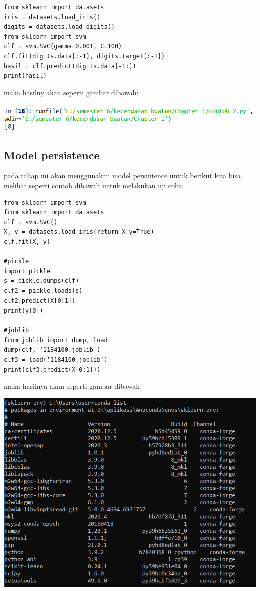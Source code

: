\documentclass{homework}
\begin{document}
\begin{verbatim}
from sklearn import datasets 
iris = datasets.load_iris()
digits = datasets.load_digits()
from sklearn import svm
clf = svm.SVC(gamma=0.001, C=100)
clf.fit(digits.data[:-1], digits.target[:-1])
hasil = clf.predict(digits.data[-1:])
print(hasil)
\end{verbatim}
maka hasilny akan seperti gambar dibawah:
\begin{center}
    \includegraphics[width=.8\textwidth]{figures/1184100/Hasil2.PNG}
\end{center}

\subsection{Model persistence}
pada tahap ini akan menggunakan model persintence untuk 
berikut kita bisa melihat seperti contoh dibawah untuk melakukan uji coba

\begin{verbatim}
from sklearn import svm
from sklearn import datasets
clf = svm.SVC()
X, y = datasets.load_iris(return_X_y=True)
clf.fit(X, y)

#pickle
import pickle 
s = pickle.dumps(clf)
clf2 = pickle.loads(s)
clf2.predict(X[0:1])
print(y[0])

#joblib
from joblib import dump, load
dump(clf, '1184100.joblib')
clf3 = load('1184100.joblib')
print(clf3.predict(X[0:1]))
\end{verbatim}
maka hasilnya akan seperti gambar dibawah 
\begin{center}
    \includegraphics[width=.8\textwidth]{figures/1184100/instal3.PNG}
\end{center}
\end{document}
